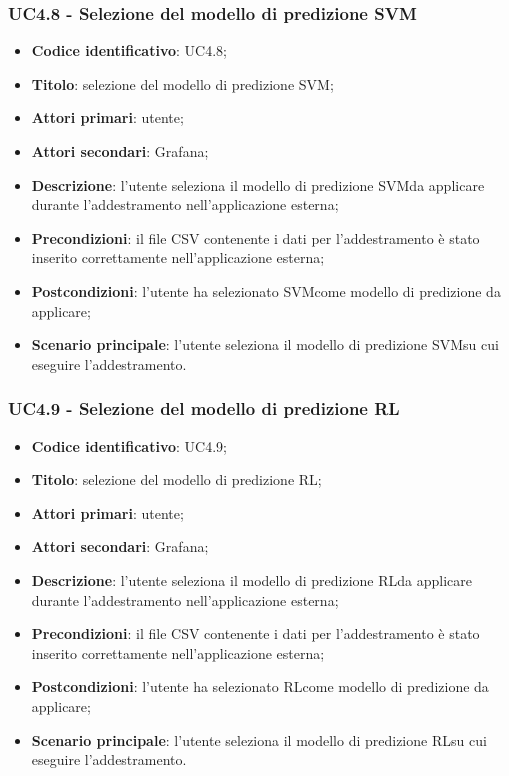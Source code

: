 \subsubsection{UC4.8 - Selezione del modello di predizione SVM}
\begin{itemize}
	\item \textbf{Codice identificativo}: UC4.8;
	\item \textbf{Titolo}: selezione del modello di predizione SVM\glo;
	\item \textbf{Attori primari}: utente;
	\item \textbf{Attori secondari}: Grafana\glo;
	\item \textbf{Descrizione}: l'utente seleziona il modello di predizione SVM\glosp da applicare durante l'addestramento nell'applicazione esterna;
	\item \textbf{Precondizioni}: il file CSV contenente i dati per l'addestramento è stato inserito correttamente nell'applicazione esterna;
	\item \textbf{Postcondizioni}: l'utente ha selezionato SVM\glosp come modello di predizione da applicare;
	\item \textbf{Scenario principale}: l'utente seleziona il modello di predizione SVM\glosp su cui eseguire l'addestramento.
\end{itemize}
\subsubsection{UC4.9 - Selezione del modello di predizione RL}
\begin{itemize}
	\item \textbf{Codice identificativo}: UC4.9;
	\item \textbf{Titolo}: selezione del modello di predizione RL\glo;
	\item \textbf{Attori primari}: utente;
	\item \textbf{Attori secondari}: Grafana\glo;
	\item \textbf{Descrizione}: l'utente seleziona il modello di predizione RL\glosp da applicare durante l'addestramento nell'applicazione esterna;
	\item \textbf{Precondizioni}: il file CSV contenente i dati per l'addestramento è stato inserito correttamente nell'applicazione esterna;
	\item \textbf{Postcondizioni}: l'utente ha selezionato RL\glosp come modello di predizione da applicare;
	\item \textbf{Scenario principale}: l'utente seleziona il modello di predizione RL\glosp su cui eseguire l'addestramento.
\end{itemize}

